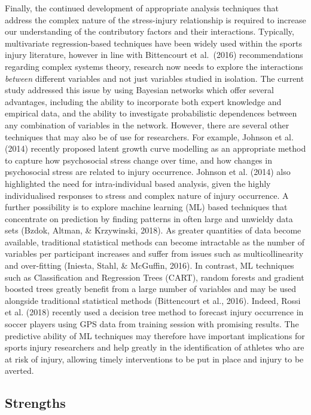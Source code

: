 \documentclass[
  english,
  man,floatsintext]{apa6}
\begin{document}
Finally, the continued development of appropriate analysis techniques that address the complex nature of the stress-injury relationship is required to increase our understanding of the contributory factors and their interactions.
Typically, multivariate regression-based techniques have been widely used within the sports injury literature, however in line with Bittencourt et al.~(2016) recommendations regarding complex systems theory, research now needs to explore the interactions \emph{between} different variables and not just variables studied in isolation.
The current study addressed this issue by using Bayesian networks which offer several advantages, including the ability to incorporate both expert knowledge and empirical data, and the ability to investigate probabilistic dependences between any combination of variables in the network.
However, there are several other techniques that may also be of use for researchers.
For example, Johnson et al. (2014) recently proposed latent growth curve modelling as an appropriate method to capture how psychosocial stress change over time, and how changes in psychosocial stress are related to injury occurrence.
Johnson et al. (2014) also highlighted the need for intra-individual based analysis, given the highly individualised responses to stress and complex nature of injury occurrence.
A further possibility is to explore machine learning (ML) based techniques that concentrate on prediction by finding patterns in often large and unwieldy data sets (Bzdok, Altman, \& Krzywinski, 2018).
As greater quantities of data become available, traditional statistical methods can become intractable as the number of variables per participant increases and suffer from issues such as multicollinearity and over-fitting (Iniesta, Stahl, \& McGuffin, 2016).
In contrast, ML techniques such as Classification and Regression Trees (CART), random forests and gradient boosted trees greatly benefit from a large number of variables and may be used alongside traditional statistical methods (Bittencourt et al., 2016).
Indeed, Rossi et al. (2018) recently used a decision tree method to forecast injury occurrence in soccer players using GPS data from training session with promising results.
The predictive ability of ML techniques may therefore have important implications for sports injury researchers and help greatly in the identification of athletes who are at risk of injury, allowing timely interventions to be put in place and injury to be averted.

\hypertarget{strengths}{%
\subsection{Strengths}\label{strengths}}
\end{document}
